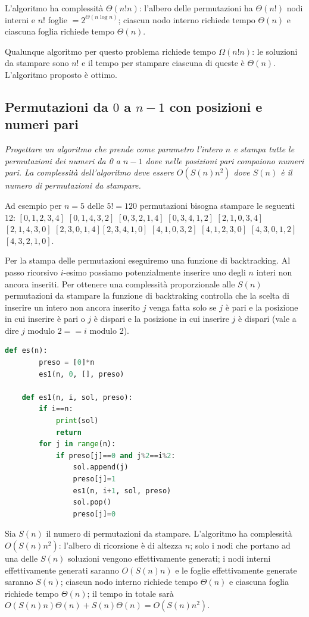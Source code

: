 L'algoritmo ha complessità $\Theta(n!n)$: l'albero delle permutazioni ha $\Theta(n!)$ nodi interni e $n!$ foglie $= 2^{\Theta(n\log n)}$; ciascun nodo interno richiede tempo $\Theta(n)$ e ciascuna foglia richiede tempo $\Theta(n)$.

Qualunque algoritmo per questo problema richiede tempo $\Omega(n!n)$: le soluzioni da stampare sono $n!$ e il tempo per stampare ciascuna di queste è $\Theta(n)$. L'algoritmo proposto è ottimo.

\subsection{Permutazioni da $0$ a $n-1$ con posizioni e numeri pari}
\textit{Progettare un algoritmo che prende come parametro l'intero $n$ e stampa tutte le permutazioni dei numeri da 0 a $n-1$ dove nelle posizioni pari compaiono numeri pari. La complessità dell'algoritmo deve essere $O(S(n) n^2)$ dove $S(n)$ è il numero di permutazioni da stampare.}

Ad esempio per $n = 5$ delle $5!=120$ permutazioni bisogna stampare le seguenti 12:
$[0,1,2,3,4]$ $[0,1,4,3,2]$ $[0,3,2,1,4]$ $[0,3,4,1,2]$ $[2,1,0,3,4]$ $[2,1,4,3,0]$ $[2,3,0,1,4]$$[2,3,4,1,0]$ $[4,1,0,3,2]$ $[4,1,2,3,0]$ $[4,3,0,1,2]$ $[4,3,2,1,0]$.

Per la stampa delle permutazioni eseguiremo una funzione di backtracking. Al passo ricorsivo $i$-esimo possiamo potenzialmente inserire uno degli $n$ interi non ancora inseriti. Per ottenere una complessità proporzionale alle $S(n)$ permutazioni da stampare la funzione di backtraking controlla che la scelta di inserire un intero non ancora inserito $j$ venga fatta solo se $j$ è pari e la posizione in cui inserire è pari o $j$ è dispari e la posizione in cui inserire $j$ è dispari (vale a dire $j$ modulo $2 == i$ modulo 2).

\begin{lstlisting}[language=Python]
    def es(n): 
        preso = [0]*n 
        es1(n, 0, [], preso)
    
    def es1(n, i, sol, preso):
        if i==n:
            print(sol)
            return
        for j in range(n):
            if preso[j]==0 and j%2==i%2:
                sol.append(j)
                preso[j]=1
                es1(n, i+1, sol, preso)
                sol.pop()
                preso[j]=0
\end{lstlisting}

Sia $S(n)$ il numero di permutazioni da stampare. L'algoritmo ha complessità $O(S(n)n^2)$: l'albero di ricorsione è di altezza $n$; solo i nodi che portano ad una delle $S(n)$ soluzioni vengono effettivamente generati; i nodi interni effettivamente generati saranno $O(S(n) n)$ e le foglie effettivamente generate saranno $S(n)$; ciascun nodo interno richiede tempo $\Theta(n)$ e ciascuna foglia richiede tempo $\Theta(n)$; il tempo in totale sarà $O(S(n) n)\Theta(n)+ S(n) \Theta(n)= O(S(n)n^2)$.

